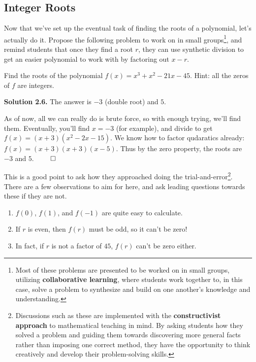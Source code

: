 \subsection{Integer Roots}

Now that we've set up the eventual task of finding the roots of a polynomial, let's actually do it. Propose the following problem to work on in small groups\footnote{Most of these problems are presented to be worked on in small groups, utilizing \textbf{collaborative learning}, where students work together to, in this case, solve a problem to synthesize and build on one another's knowledge and understanding.}, and remind students that once they find a root $r$, they can use synthetic division to get an easier polynomial to work with by factoring out $x-r$.

\begin{example}
    Find the roots of the polynomial $f(x) = x^3+x^2-21x-45$. Hint: all the zeros of $f$ are integers.
\end{example}

\textbf{Solution 2.6.} The answer is $-3$ (double root) and $5$. 

As of now, all we can really do is brute force, so with enough trying, we'll find them. Eventually, you'll find $x = -3$ (for example), and divide to get $f(x) = (x+3)(x^2-2x-15)$. We know how to factor qudaratics already: $f(x) = (x+3)(x+3)(x-5)$. Thus by the zero property, the roots are $-3$ and $5$. \hspace*{\fill} $\qed$

This is a good point to ask how they approached doing the trial-and-error\footnote{Discussions such as these are implemented with the \textbf{constructivist approach} to mathematical teaching in mind. By asking students how they solved a problem and guiding them towards discovering more general facts rather than imposing one correct method, they have the opportunity to think creatively and develop their problem-solving skills.}. There are a few observations to aim for here, and ask leading questions towards these if they are not.

\begin{enumerate}
    \item $f(0)$, $f(1)$, and $f(-1)$ are quite easy to calculate.
    \item If $r$ is even, then $f(r)$ must be odd, so it can't be zero!
    \item In fact, if $r$ is not a factor of $45$, $f(r)$ can't be zero either.
\end{enumerate}


